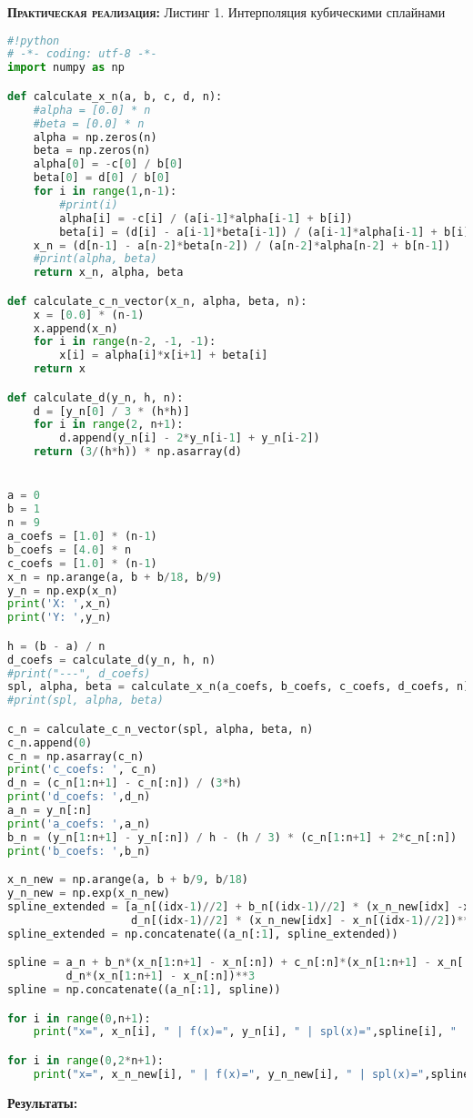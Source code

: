 \documentclass [12pt]{article}
\begin{document}
\textsc{\textbf{Практическая реализация:}}
Листинг 1. Интерполяция кубическими сплайнами
\begin{lstlisting}[language=python]
#!python
# -*- coding: utf-8 -*-
import numpy as np

def calculate_x_n(a, b, c, d, n):
    #alpha = [0.0] * n
    #beta = [0.0] * n
    alpha = np.zeros(n)
    beta = np.zeros(n)    
    alpha[0] = -c[0] / b[0]
    beta[0] = d[0] / b[0]
    for i in range(1,n-1):
        #print(i)
        alpha[i] = -c[i] / (a[i-1]*alpha[i-1] + b[i])
        beta[i] = (d[i] - a[i-1]*beta[i-1]) / (a[i-1]*alpha[i-1] + b[i])
    x_n = (d[n-1] - a[n-2]*beta[n-2]) / (a[n-2]*alpha[n-2] + b[n-1])
    #print(alpha, beta)
    return x_n, alpha, beta

def calculate_c_n_vector(x_n, alpha, beta, n):
    x = [0.0] * (n-1)
    x.append(x_n)
    for i in range(n-2, -1, -1):
        x[i] = alpha[i]*x[i+1] + beta[i]
    return x

def calculate_d(y_n, h, n):
    d = [y_n[0] / 3 * (h*h)]
    for i in range(2, n+1):
        d.append(y_n[i] - 2*y_n[i-1] + y_n[i-2])
    return (3/(h*h)) * np.asarray(d)


a = 0
b = 1
n = 9
a_coefs = [1.0] * (n-1)
b_coefs = [4.0] * n
c_coefs = [1.0] * (n-1)
x_n = np.arange(a, b + b/18, b/9)
y_n = np.exp(x_n)
print('X: ',x_n)
print('Y: ',y_n)

h = (b - a) / n
d_coefs = calculate_d(y_n, h, n)
#print("---", d_coefs)
spl, alpha, beta = calculate_x_n(a_coefs, b_coefs, c_coefs, d_coefs, n)
#print(spl, alpha, beta)

c_n = calculate_c_n_vector(spl, alpha, beta, n)
c_n.append(0)
c_n = np.asarray(c_n)
print('c_coefs: ', c_n)
d_n = (c_n[1:n+1] - c_n[:n]) / (3*h)
print('d_coefs: ',d_n)
a_n = y_n[:n]
print('a_coefs: ',a_n)
b_n = (y_n[1:n+1] - y_n[:n]) / h - (h / 3) * (c_n[1:n+1] + 2*c_n[:n])
print('b_coefs: ',b_n)

x_n_new = np.arange(a, b + b/9, b/18)
y_n_new = np.exp(x_n_new)
spline_extended = [a_n[(idx-1)//2] + b_n[(idx-1)//2] * (x_n_new[idx] -x_n[(idx-1)//2]) + c_n[(idx-1)//2] * (x_n_new[idx] - x_n[(idx-1)//2])**2 +\
                   d_n[(idx-1)//2] * (x_n_new[idx] - x_n[(idx-1)//2])**3 for idx in range(1, len(a_n)*2+1)]
spline_extended = np.concatenate((a_n[:1], spline_extended))

spline = a_n + b_n*(x_n[1:n+1] - x_n[:n]) + c_n[:n]*(x_n[1:n+1] - x_n[:n])**2 +\
         d_n*(x_n[1:n+1] - x_n[:n])**3
spline = np.concatenate((a_n[:1], spline))

for i in range(0,n+1):
    print("x=", x_n[i], " | f(x)=", y_n[i], " | spl(x)=",spline[i], " | delta=", np.abs(y_n[i]-spline[i]))

for i in range(0,2*n+1):
    print("x=", x_n_new[i], " | f(x)=", y_n_new[i], " | spl(x)=",spline_extended[i], " | delta=", np.abs(y_n_new[i]-spline_extended[i]))


\end{lstlisting}
\textbf{Результаты:}
\end{document}
